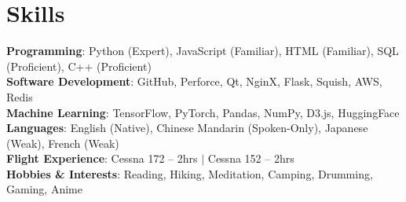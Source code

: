 \section{Skills}
 \begin{itemize}[leftmargin=0.5cm, label={}]
    \small{\item{
     \textbf{Programming}{: Python (Expert), JavaScript (Familiar), HTML (Familiar), SQL (Proficient), C++ (Proficient)} \\
     \textbf{Software Development}{: GitHub, Perforce, Qt, NginX, Flask, Squish, AWS, Redis} \\
     \textbf{Machine Learning}{: TensorFlow, PyTorch, Pandas, NumPy, D3.js, HuggingFace} \\
     \textbf{Languages}{: English (Native), Chinese Mandarin (Spoken-Only), Japanese (Weak), French (Weak)} \\
     \textbf{Flight Experience}{: Cessna 172 -- 2hrs $|$ Cessna 152 -- 2hrs} \\
     \textbf{Hobbies \& Interests}{: Reading, Hiking, Meditation, Camping, Drumming, Gaming, Anime} \\
    }}
 \end{itemize}